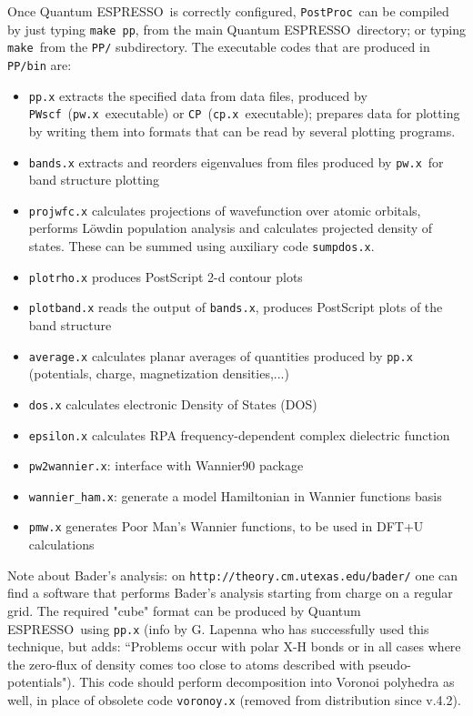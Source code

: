 \documentclass[12pt,a4paper]{article}
\def\qe{{\sc Quantum ESPRESSO}}
\def\pwx{\texttt{pw.x}}
\def\cpx{\texttt{cp.x}}
\def\PWscf{\texttt{PWscf}}
\def\CP{\texttt{CP}}
\def\PostProc{\texttt{PostProc}}
\def\make{\texttt{make}}
\begin{document}
Once \qe\ is correctly configured, \PostProc\ can be compiled by
just typing \texttt{make pp}, from the main \qe\ directory;
or typing \make\ from the \texttt{PP/} subdirectory.
The executable codes that are produced in \texttt{PP/bin} are:
\begin{itemize}
\item  \texttt{pp.x} extracts the specified data from data files,
  produced by \PWscf\ (\pwx\ executable) or \CP\ (\cpx\ executable);
  prepares data for plotting by writing them into formats that can be
  read by several plotting programs. 
\item  \texttt{bands.x} extracts and reorders eigenvalues from files 
  produced by \pwx\ for band structure plotting 
\item  \texttt{projwfc.x} calculates projections of wavefunction over atomic
  orbitals, performs L\"owdin population analysis and calculates
  projected density of states. These can be summed using auxiliary
  code  \texttt{sumpdos.x}. 
\item  \texttt{plotrho.x} produces PostScript 2-d contour plots
\item  \texttt{plotband.x} reads the output of  \texttt{bands.x}, produces 
  PostScript plots of the band structure
\item  \texttt{average.x} calculates planar averages of quantities produced by
   \texttt{pp.x} (potentials, charge, magnetization densities,...) 
\item  \texttt{dos.x} calculates electronic Density of States (DOS)
\item \texttt{epsilon.x} calculates RPA frequency-dependent complex dielectric function
\item  \texttt{pw2wannier.x}: interface with Wannier90 package
\item  \texttt{wannier\_ham.x}: generate a model Hamiltonian 
in Wannier functions basis
\item  \texttt{pmw.x} generates Poor Man's Wannier functions, to be used in
  DFT+U calculations 
\end{itemize}
Note about Bader's analysis: on
\texttt{http://theory.cm.utexas.edu/bader/} one can find a software that performs
Bader's analysis starting from charge on a regular grid. The required 
"cube" format can be produced by \qe\ using  \texttt{pp.x} (info by G. Lapenna
who has successfully used this technique, but adds: ``Problems occur with polar 
X-H bonds or in all cases where the zero-flux of density comes too close to 
atoms described with pseudo-potentials"). This code should perform 
decomposition into Voronoi polyhedra as well, in place of obsolete
code  \texttt{voronoy.x} (removed from distribution since v.4.2).
\end{document}
